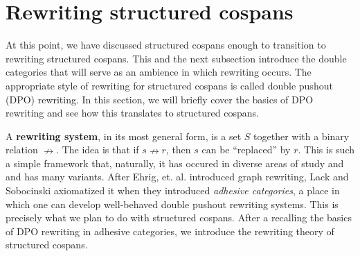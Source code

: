 \documentclass{amsart}
\newcommand{\defn}[1]{\textbf{#1}}
\newcommand{\rel}{\nrightarrow}
\theoremstyle{remark}
\theoremstyle{definition}
\begin{document}

\section{Rewriting structured cospans}
\label{sec:rewriting-strcsp}

At this point, we have discussed structured cospans enough to
transition to rewriting structured cospans. This and the next
subsection introduce the double categories that will serve as an
ambience in which rewriting occurs.  The appropriate style of
rewriting for structured cospans is called double pushout (DPO)
rewriting. In this section, we will briefly cover the basics of DPO
rewriting and see how this translates to structured cospans.

A \defn{rewriting system}, in its most general form, is a set $ S $
together with a binary relation $ \rel $. The idea is that if
$ s \rel r$, then $ s $ can be ``replaced'' by $ r $. This is such a
simple framework that, naturally, it has occured in diverse areas of
study and and has many variants.  After Ehrig, et. al.
%
%
introduced graph rewriting, Lack and Sobocinski axiomatized it when
they introduced \emph{adhesive categories},
%
%
a place in which one can develop well-behaved double pushout rewriting
systems. This is precisely what we plan to do with structured
cospans. After a recalling the basics of DPO rewriting in adhesive
categories, we introduce the rewriting theory of structured cospans.
\end{document}
